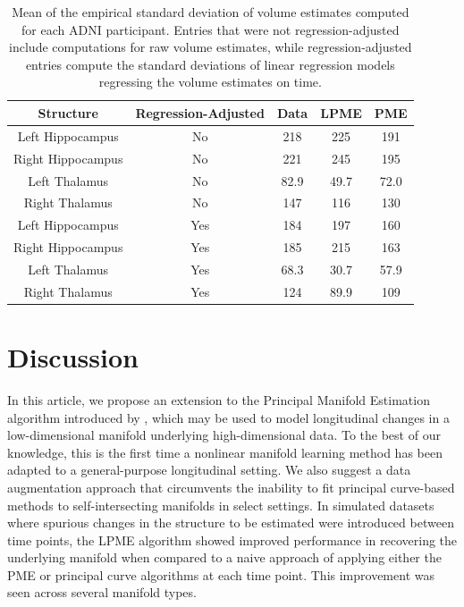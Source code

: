 \documentclass[11pt,reqno]{article}
\theoremstyle{definition}
\begin{document}
\begin{table}[ht]
  \centering
  \begin{tabular}{|c c c c c|}
    \hline
    Structure & Regression-Adjusted & Data & LPME & PME  \\
    \hline
    Left Hippocampus & No & 218 & 225 & 191 \\
    Right Hippocampus & No & 221 & 245 & 195 \\
    Left Thalamus & No & 82.9 & 49.7 & 72.0 \\
    Right Thalamus & No & 147 & 116 & 130 \\
    Left Hippocampus & Yes & 184 & 197 & 160 \\
    Right Hippocampus & Yes & 185 & 215 & 163 \\
    Left Thalamus & Yes & 68.3 & 30.7 & 57.9 \\
    Right Thalamus & Yes & 124 & 89.9 & 109 \\
    \hline
  \end{tabular}
  \caption{Mean of the empirical standard deviation of volume estimates computed for each ADNI participant. Entries that were not regression-adjusted include computations for raw volume estimates, while regression-adjusted entries compute the standard deviations of linear regression models regressing the volume estimates on time.}
  \label{table:adni_volume_sds}
\end{table}



\section{Discussion}\label{s:discussion}

In this article, we propose an extension to the Principal Manifold Estimation algorithm introduced by \cite{mengPrincipalManifoldEstimation2021}, which may be used to model longitudinal changes in a low-dimensional manifold underlying high-dimensional data. To the best of our knowledge, this is the first time a nonlinear manifold learning method has been adapted to a general-purpose longitudinal setting. We also suggest a data augmentation approach that circumvents the inability to fit principal curve-based methods to self-intersecting manifolds in select settings. In simulated datasets where spurious changes in the structure to be estimated were introduced between time points, the LPME algorithm showed improved performance in recovering the underlying manifold when compared to a naive approach of applying either the PME or principal curve algorithms at each time point. This improvement was seen across several manifold types.
\end{document}
